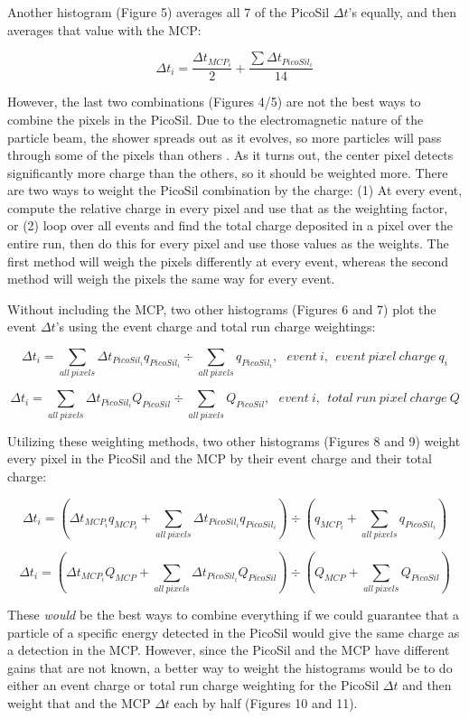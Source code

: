 \documentclass[12pt]{article}
\begin{document}
	Another histogram (Figure 5) averages all 7 of the PicoSil $\Delta t$’s equally, and then averages that value with the MCP:

\[
\Delta t_i = \dfrac{ \Delta t_{MCP_i} }{2} + \dfrac{\sum \Delta t_{PicoSil_i} }{14}
\]

However, the last two combinations (Figures 4/5) are not the best ways to combine the pixels in the PicoSil. 
Due to the electromagnetic nature of the particle beam, the shower spreads out as it evolves, so more particles will pass through some of the pixels than others \cite{P2}. 
As it turns out, the center pixel detects significantly more charge than the others, so it should be weighted more. 
There are two ways to weight the PicoSil combination by the charge: (1) At every event, compute the relative charge in every pixel and use that as the weighting factor, or (2) loop over all events and find the total charge deposited in a pixel over the entire run, then do this for every pixel and use those values as the weights. 
The first method will weigh the pixels differently at every event, whereas the second method will weigh the pixels the same way for every event.

Without including the MCP, two other histograms (Figures 6 and 7) plot the event $\Delta t$’s using the event charge and total run charge weightings:

\[
\Delta t_i = \sum_{all\ pixels} \Delta t_{PicoSil_i} q_{PicoSil_i} \div \sum_{all\ pixels} q_{PicoSil_i}
,\ \ \ event\ i
,\ \ event\ pixel\ charge\ q_i
\]

\[
\Delta t_i = \sum_{all\ pixels} \Delta t_{PicoSil_i} Q_{PicoSil} \div \sum_{all\ pixels} Q_{PicoSil}
,\ \ \ event\ i
,\ \ total\ run\ pixel\ charge\ Q
\]

Utilizing these weighting methods, two other histograms (Figures 8 and 9) weight every pixel in the PicoSil and the MCP by their event charge and their total charge:

\[
\Delta t_i = 
\left( \Delta t_{MCP_i} q_{MCP_i} +
\sum_{all\ pixels} \Delta t_{PicoSil_i} q_{PicoSil_i} \right)
\div
\left( q_{MCP_i} +
\sum_{all\ pixels} q_{PicoSil_i} \right)
\]

\[
\Delta t_i = 
\left( \Delta t_{MCP_i} Q_{MCP} +
\sum_{all\ pixels} \Delta t_{PicoSil_i} Q_{PicoSil} \right)
\div
\left( Q_{MCP} +
\sum_{all\ pixels} Q_{PicoSil} \right)
\]

These \textit{would} be the best ways to combine everything if we could guarantee that a particle of a specific energy detected in the PicoSil would give the same charge as a detection in the MCP. 
However, since the PicoSil and the MCP have different gains that are not known, a better way to weight the histograms would be to do either an event charge or total run charge weighting for the PicoSil $\Delta t$ and then weight that and the MCP $\Delta t$ each by half (Figures 10 and 11).
\end{document}
